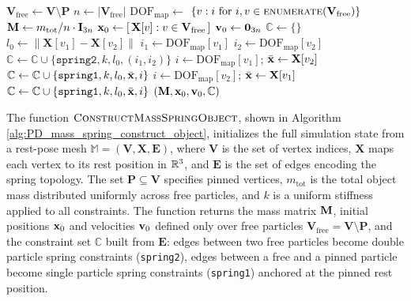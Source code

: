 \begin{algorithm}[H]
\caption{Construct initial simulation state from rest mesh and parameters.}
\label{alg:PD_mass_spring_construct_object}
\begin{algorithmic}[1]
\addtolength{\itemsep}{0.4ex}
    \State $\mathbf{V}_{\text{free}} \gets \mathbf{V} \setminus \mathbf{P}$
    \State $n \gets |\mathbf{V}_{\text{free}}|$
    \State $\text{DOF}_{\text{map}} \gets$   $\{v:i\text{ for } i, v \in \textsc{enumerate}(\mathbf{V}_{\text{free}})\}$
    \State $\mathbf{M} \gets m_{\text{tot}} / n\cdot\mathbf{I}_{3n}$
    \State $\mathbf{x}_0 \gets \left[\,\mathbf{X}[v] : v \in \mathbf{V}_{\text{free}}\,\right]$ 
    \State $\mathbf{v}_0 \gets \mathbf{0}_{3n}$
    \State $\mathbb{C} \gets \{\}$
        \State $l_0 \gets \|\mathbf{X}[v_1] - \mathbf{X}[v_2]\|$
            \State $i_1 \gets \text{DOF}_{\text{map}}[v_1]$
            \State $i_2 \gets \text{DOF}_{\text{map}}[v_2]$
            \State $\mathbb{C} \gets \mathbb{C} \cup \{\texttt{spring2}, k, l_0, (i_1, i_2)\}$
            \State $i \gets \text{DOF}_{\text{map}}[v_1]$; 
            \State $\bar{\mathbf{x}} \gets \mathbf{X}[v_2]$
            \State $\mathbb{C} \gets \mathbb{C} \cup \{\texttt{spring1}, k, l_0, \bar{\mathbf{x}}, i\}$
            \State $i \gets \text{DOF}_{\text{map}}[v_2]$; 
            \State $\bar{\mathbf{x}} \gets \mathbf{X}[v_1]$
            \State $\mathbb{C} \gets \mathbb{C} \cup \{\texttt{spring1}, k, l_0, \bar{\mathbf{x}}, i\}$
        \EndIf
    \EndFor
    \State \Return $(\mathbf{M}, \mathbf{x}_0, \mathbf{v}_0, \mathbb{C})$
\EndFunction
\end{algorithmic}
\end{algorithm}

The function $\textsc{ConstructMassSpringObject}$, shown in Algorithm \ref{alg:PD_mass_spring_construct_object}, initializes the full simulation state from a rest-pose mesh  $\mathbb{M} = (\mathbf{V}, \mathbf{X}, \mathbf{E})$, where $\mathbf{V}$ is the set of vertex indices,  $\mathbf{X}$ maps each vertex to its rest position in $\mathbb{R}^3$, and $\mathbf{E}$ is the set of edges  encoding the spring topology. The set $\mathbf{P} \subseteq \mathbf{V}$ specifies pinned vertices,  $m_{\text{tot}}$ is the total object mass distributed uniformly across free particles, and $k$ is a  uniform stiffness applied to all constraints. The function returns the mass matrix $\mathbf{M}$,  initial positions $\mathbf{x}_0$ and velocities $\mathbf{v}_0$ defined only over free particles  $\mathbf{V}_{\text{free}} = \mathbf{V} \setminus \mathbf{P}$, and the constraint set $\mathbb{C}$  built from $\mathbf{E}$: edges between two free particles become double particle spring constraints (\texttt{spring2}),  edges between a free and a pinned particle become single particle spring constraints (\texttt{spring1}) anchored at the pinned rest position.

